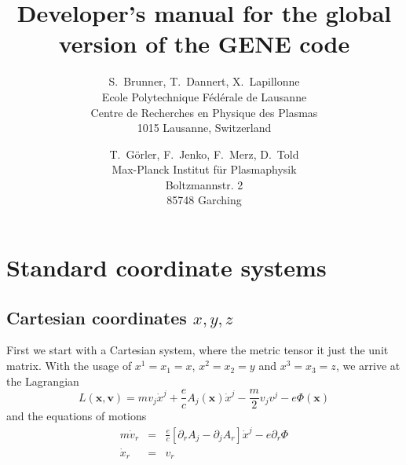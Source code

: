 \documentclass[12pt]{report}
\title{Developer's manual for the global version of the GENE code}
\author{S.~Brunner, T.~Dannert, X.~Lapillonne\\Ecole Polytechnique
  F\'ed\'erale de Lausanne\\Centre de Recherches en Physique des
  Plasmas\\1015 Lausanne, Switzerland \and T.~G\"orler, F.~Jenko,
  F.~Merz, D.~Told\\Max-Planck Institut f\"ur
  Plasmaphysik\\Boltzmannstr. 2\\85748 Garching}
\begin{document}
\maketitle
\tableofcontents






\appendix
\chapter{Standard coordinate systems}

\section{Cartesian coordinates $x,y,z$}
First we start with a Cartesian  system, where the metric tensor it just the
unit matrix. With the usage of $x^1=x_1=x$, $x^2=x_2=y$ and $x^3=x_3=z$, we arrive at the Lagrangian
\begin{displaymath}
  L(\mathbf{x},\mathbf{v}) =
  mv_j\dot x^j
  +\frac{e}{c}A_j(\mathbf{x})\dot x^j
  -\frac{m}{2}v_jv^j
  -e\Phi(\mathbf{x})
\end{displaymath}
and the equations of motions
\begin{eqnarray*}
  m\dot v_r &=&
  \frac{e}{c}\left[
    \partial_rA_j
    -\partial_jA_r
  \right]\dot x^j
  -e\partial_r\Phi\\
  \dot x_r &=& v_r
\end{eqnarray*}
\end{document}
